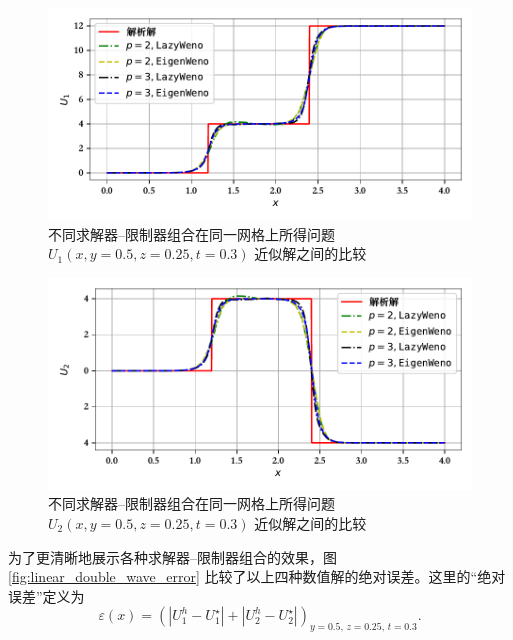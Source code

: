 \begin{figure}[h!]
\begin{centering}
\includegraphics[width=1\textwidth,height=0.3\textheight]{figures/linear_system/u_1}
\par\end{centering}
\caption{\label{fig:linear_double_wave_sample_u1}不同求解器–限制器组合在同一网格上所得问题
$U_{1}(x,y=0.5,z=0.25,t=0.3)$ 近似解之间的比较}
\end{figure}

\begin{figure}[h!]
\begin{centering}
\includegraphics[width=1\textwidth,height=0.3\textheight]{figures/linear_system/u_2}
\par\end{centering}
\caption{\label{fig:linear_double_wave_sample_u2}不同求解器–限制器组合在同一网格上所得问题
$U_{2}(x,y=0.5,z=0.25,t=0.3)$ 近似解之间的比较}
\end{figure}

为了更清晰地展示各种求解器–限制器组合的效果，图 \ref{fig:linear_double_wave_error} 比较了以上四种数值解的绝对误差。这里的“绝对误差”定义为
\begin{equation}
\varepsilon(x)=\left(\left|U_{1}^{h}-U_{1}^{\star}\right|+\left|U_{2}^{h}-U_{2}^{\star}\right|\right)_{y=0.5,\,z=0.25,\,t=0.3}.
\end{equation}

